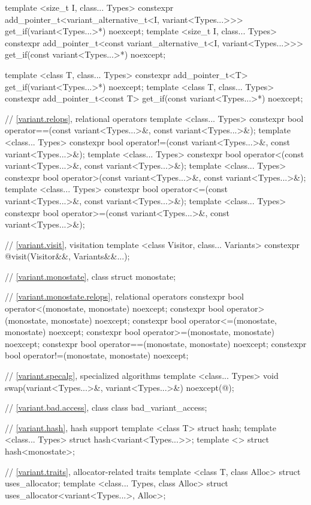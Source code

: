 \begin{codeblock}
{  template <size_t I, class... Types>
    constexpr add_pointer_t<variant_alternative_t<I, variant<Types...>>>
      get_if(variant<Types...>*) noexcept;
  template <size_t I, class... Types>
    constexpr add_pointer_t<const variant_alternative_t<I, variant<Types...>>>
      get_if(const variant<Types...>*) noexcept;

  template <class T, class... Types>
    constexpr add_pointer_t<T>
      get_if(variant<Types...>*) noexcept;
  template <class T, class... Types>
    constexpr add_pointer_t<const T>
      get_if(const variant<Types...>*) noexcept;

  // \ref{variant.relops}, relational operators
  template <class... Types>
    constexpr bool operator==(const variant<Types...>&, const variant<Types...>&);
  template <class... Types>
    constexpr bool operator!=(const variant<Types...>&, const variant<Types...>&);
  template <class... Types>
    constexpr bool operator<(const variant<Types...>&, const variant<Types...>&);
  template <class... Types>
    constexpr bool operator>(const variant<Types...>&, const variant<Types...>&);
  template <class... Types>
    constexpr bool operator<=(const variant<Types...>&, const variant<Types...>&);
  template <class... Types>
    constexpr bool operator>=(const variant<Types...>&, const variant<Types...>&);

  // \ref{variant.visit}, visitation
  template <class Visitor, class... Variants>
    constexpr @\seebelow@ visit(Visitor&&, Variants&&...);

  // \ref{variant.monostate}, class 
  struct monostate;

  // \ref{variant.monostate.relops},  relational operators
  constexpr bool operator<(monostate, monostate) noexcept;
  constexpr bool operator>(monostate, monostate) noexcept;
  constexpr bool operator<=(monostate, monostate) noexcept;
  constexpr bool operator>=(monostate, monostate) noexcept;
  constexpr bool operator==(monostate, monostate) noexcept;
  constexpr bool operator!=(monostate, monostate) noexcept;

  // \ref{variant.specalg}, specialized algorithms
  template <class... Types>
    void swap(variant<Types...>&, variant<Types...>&) noexcept(@\seebelow@);

  // \ref{variant.bad.access}, class 
  class bad_variant_access;

  // \ref{variant.hash}, hash support
  template <class T> struct hash;
  template <class... Types> struct hash<variant<Types...>>;
  template <> struct hash<monostate>;

  // \ref{variant.traits}, allocator-related traits
  template <class T, class Alloc> struct uses_allocator;
  template <class... Types, class Alloc> struct uses_allocator<variant<Types...>, Alloc>;
}
\end{codeblock}

